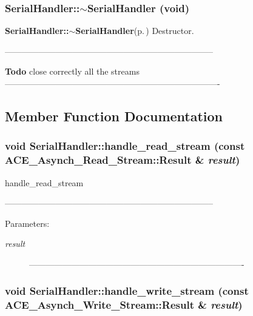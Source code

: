 \subsubsection{\setlength{\rightskip}{0pt plus 5cm}Serial\-Handler::$\sim${\bf Serial\-Handler} (void)}\label{classSerialHandler_a1}


{\bf Serial\-Handler::$\sim$Serial\-Handler}{\rm (p.\,\pageref{classSerialHandler_a1})} Destructor. 

-------------------------------------------------------------------------- 

\begin{Desc}
\item[{\bf Todo}]close correctly all the streams ----------------------------------------------------------------------------\end{Desc}


\subsection{Member Function Documentation}
\subsubsection{\setlength{\rightskip}{0pt plus 5cm}void Serial\-Handler::handle\_\-read\_\-stream (const ACE\_\-Asynch\_\-Read\_\-Stream::Result \& {\em result})\hspace{0.3cm}{\tt  [protected, virtual]}}\label{classSerialHandler_b0}


handle\_\-read\_\-stream 

-------------------------------------------------------------------------- 

\begin{Desc}
\item[Parameters:]
\begin{description}
\item[{\em result}]---------------------------------------------------------------------------- \end{description}
\end{Desc}
\subsubsection{\setlength{\rightskip}{0pt plus 5cm}void Serial\-Handler::handle\_\-write\_\-stream (const ACE\_\-Asynch\_\-Write\_\-Stream::Result \& {\em result})\hspace{0.3cm}{\tt  [protected, virtual]}}\label{classSerialHandler_b1}


